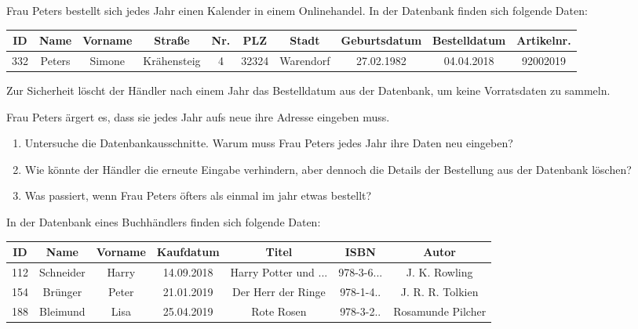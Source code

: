 \documentclass[10pt, a5paper,landscape]{scrartcl}
\begin{document}
\clearpage
\ReiheTitel

Frau Peters bestellt sich jedes Jahr einen Kalender in einem Onlinehandel. In der Datenbank finden sich folgende Daten:

{\footnotesize
\begin{tabular}{|*{10}{c|}}\hline
	\rowcolor{ngb.tabelle.kopf.hg} ID & Name & Vorname & Straße & Nr. & PLZ & Stadt & Geburtsdatum & Bestelldatum & Artikelnr. \\ \hline
	332 & Peters & Simone & Krähensteig & 4 & 32324 & Warendorf & 27.02.1982 & 04.04.2018 & 92002019 \\\hline
\end{tabular}}

Zur Sicherheit löscht der Händler nach einem Jahr das Bestelldatum aus der Datenbank, um keine Vorratsdaten zu sammeln.

Frau Peters ärgert es, dass sie jedes Jahr aufs neue ihre Adresse eingeben muss.

\vspace{1em}
\begin{aufgabe}
\begin{enumerate}
	\item Untersuche die Datenbankausschnitte. Warum muss Frau Peters jedes Jahr ihre Daten neu eingeben?
	\item Wie könnte der Händler die erneute Eingabe verhindern, aber dennoch die Details der Bestellung aus der Datenbank löschen?
	\item Was passiert, wenn Frau Peters öfters als einmal im jahr etwas bestellt? 
\end{enumerate}
\end{aufgabe}

\clearpage
\ReiheTitel

In der Datenbank eines Buchhändlers finden sich folgende Daten:

{\footnotesize
\begin{tabular}{|*{7}{c|}}\hline
	\rowcolor{ngb.tabelle.kopf.hg} ID & Name & Vorname & Kaufdatum & Titel & ISBN & Autor\\ \hline
	112 & Schneider & Harry & 14.09.2018 & Harry Potter und ... & 978-3-6... & J. K. Rowling \\\hline
	154 & Brünger & Peter & 21.01.2019 & Der Herr der Ringe & 978-1-4.. & J. R. R. Tolkien \\\hline
	188 & Bleimund & Lisa & 25.04.2019 & Rote Rosen & 978-3-2.. & Rosamunde Pilcher \\\hline
\end{tabular}}
\end{document}
